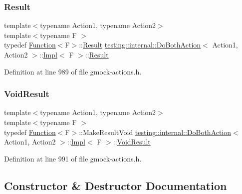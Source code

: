 \subsubsection{\texorpdfstring{Result}{Result}}
{\footnotesize\ttfamily template$<$typename Action1, typename Action2$>$ \\
template$<$typename F $>$ \\
typedef \hyperlink{structtesting_1_1internal_1_1Function}{Function}$<$F$>$\+::\hyperlink{classtesting_1_1ActionInterface_a7477de2fe3e4e01c59db698203acaee7}{Result} \hyperlink{classtesting_1_1internal_1_1DoBothAction}{testing\+::internal\+::\+Do\+Both\+Action}$<$ Action1, Action2 $>$\+::\hyperlink{classtesting_1_1internal_1_1DoBothAction_1_1Impl}{Impl}$<$ F $>$\+::\hyperlink{classtesting_1_1ActionInterface_a7477de2fe3e4e01c59db698203acaee7}{Result}}



Definition at line 989 of file gmock-\/actions.\+h.

\mbox{\label{classtesting_1_1internal_1_1DoBothAction_1_1Impl_a83909f0d1addcd1207ff45b128f33802}} 
\subsubsection{\texorpdfstring{Void\+Result}{VoidResult}}
{\footnotesize\ttfamily template$<$typename Action1, typename Action2$>$ \\
template$<$typename F $>$ \\
typedef \hyperlink{structtesting_1_1internal_1_1Function}{Function}$<$F$>$\+::Make\+Result\+Void \hyperlink{classtesting_1_1internal_1_1DoBothAction}{testing\+::internal\+::\+Do\+Both\+Action}$<$ Action1, Action2 $>$\+::\hyperlink{classtesting_1_1internal_1_1DoBothAction_1_1Impl}{Impl}$<$ F $>$\+::\hyperlink{classtesting_1_1internal_1_1DoBothAction_1_1Impl_a83909f0d1addcd1207ff45b128f33802}{Void\+Result}}



Definition at line 991 of file gmock-\/actions.\+h.



\subsection{Constructor \& Destructor Documentation}
\mbox{\label{classtesting_1_1internal_1_1DoBothAction_1_1Impl_a0808e190e7b2545bfd5bc0cc9bf4f4a4}} 
